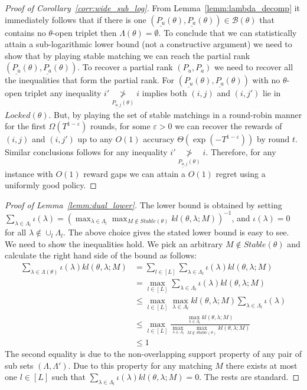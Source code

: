 \documentclass{article}
\begin{document}
\begin{proof}[Proof of Corollary~\ref{corr:wide_sub_log}] From Lemma~\ref{lemm:lambda_decomp} it immediately follows that if there is one $(\underline{P_u}(\theta), \underline{P_a}(\theta)) \in \mathcal{B}(\theta)$ that contains no $\theta$-open triplet then $\Lambda(\theta) = \emptyset$. To conclude that we can statistically attain a sub-logarithmic lower bound (not a constructive argument) we need to show that by playing stable matching we can reach the partial rank $(\underline{P_u}(\theta), \underline{P_a}(\theta))$. To recover a partial rank $(P_u, P_a)$ we need to recover all the inequalities that form the partial rank. For $(\underline{P_u}(\theta), \underline{P_a}(\theta))$ with no $\theta$-open triplet any inequality $i' \underset{\underline{P_{a,j}}(\theta)}{\not>} i$ implies both  $(i,j)$ and $(i,j')$ lie in $Locked(\theta)$. But, by playing the set of stable matchings in a round-robin manner for the first $\Omega(T^{1 -\varepsilon})$  rounds, for some $\varepsilon > 0$  we can recover the rewards of $(i,j)$ and $(i,j')$ up to any $O(1)$ accuracy $\Theta(\exp(-T^{1 -\varepsilon}))$ by round $t$.  Similar conclusions follows for any  inequality $i' \underset{\underline{P_{a,j}}(\theta)}{\not>} i$. Therefore, for any instance with $O(1)$ reward gaps we can attain a $O(1)$ regret using a uniformly good policy.   
\end{proof}


\begin{proof}[Proof of Lemma~\ref{lemm:dual_lower}]
The lower bound is  obtained   by setting $\sum_{\lambda \in \Lambda_l} \iota(\lambda) =  (\max_{\lambda \in \Lambda_l} \max_{M \notin Stable(\theta)} kl(\theta, \lambda; M))^{-1}$, and $\iota(\lambda) = 0$ for all $\lambda \notin \cup_l \Lambda_l$. The above choice gives the stated lower bound is easy to see. We need to show the inequalities hold. We pick an arbitrary $M \notin Stable(\theta)$ and calculate the right hand side of the bound as follows:
\begin{align*}
   \sum_{\lambda \in \Lambda(\theta)}\iota(\lambda) kl(\theta, \lambda; M) &= \sum_{l\in [L]}\sum_{\lambda \in \Lambda_l}\iota(\lambda) kl(\theta, \lambda; M)\\
    &=\max_{l\in [L]} \sum_{\lambda \in \Lambda_l}\iota(\lambda) kl(\theta, \lambda; M)\\
    &\leq \max_{l\in [L]} \max_{\lambda \in \Lambda_l} kl(\theta, \lambda; M) \sum_{\lambda \in \Lambda_l}\iota(\lambda) \\
    & \leq \max_{l\in [L]} \frac{\max_{\lambda \in \Lambda_l} kl(\theta, \lambda; M)}{\max_{\lambda \in \Lambda_l} \max_{M \notin Stable(\theta)}kl(\theta, \lambda; M)} \\
    &\leq 1
\end{align*}
The second equality is due to the non-overlapping support property of any pair of sub sets $(\Lambda, \Lambda')$. Due to this property for any matching $M$ there exists at most one $l \in [L]$ such that $\sum_{\lambda \in \Lambda_l}\iota(\lambda) kl(\theta, \lambda; M) = 0$.  The rests are standard.
\end{proof}
\end{document}
